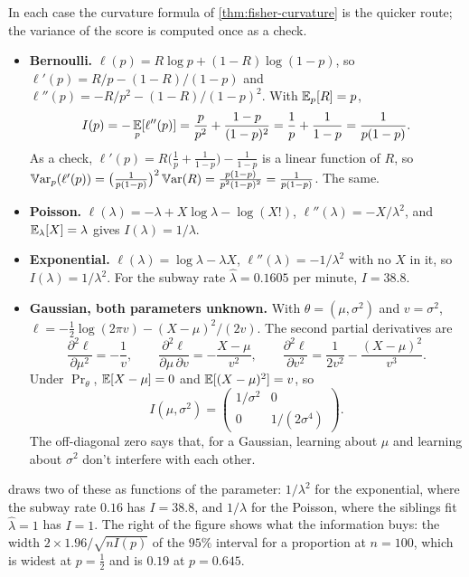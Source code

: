 \begin{worked}
In each case the curvature formula of \cref{thm:fisher-curvature} is the quicker route; the variance of the score is computed once as a check.
\begin{itemize}
\item \textbf{Bernoulli.} $\ell(p) = R\log p + (1 - R)\log(1 - p)$, so $\ell'(p) = R/p - (1-R)/(1-p)$ and $\ell''(p) = -R/p^2 - (1 - R)/(1-p)^2$. With $\operatorname*{\mathbb{E}}_p[R] = p$,
\[
I(p) = -\operatorname*{\mathbb{E}}_p[\ell''(p)] = \frac{p}{p^2} + \frac{1 - p}{(1-p)^2} = \frac1p + \frac{1}{1-p} = \frac{1}{p(1-p)}.
\]
As a check, $\ell'(p) = R\big(\frac1p + \frac{1}{1-p}\big) - \frac{1}{1-p}$ is a linear function of $R$, so $\operatorname*{\mathbb{V}\text{ar}}_p(\ell'(p)) = \big(\frac{1}{p(1-p)}\big)^2 \operatorname*{\mathbb{V}\text{ar}}(R) = \frac{p(1-p)}{p^2(1-p)^2} = \frac{1}{p(1-p)}$. The same.
\item \textbf{Poisson.} $\ell(\lambda) = -\lambda + X\log\lambda - \log(X!)$, $\ell''(\lambda) = -X/\lambda^2$, and $\operatorname*{\mathbb{E}}_\lambda[X] = \lambda$ gives $I(\lambda) = 1/\lambda$.
\item \textbf{Exponential.} $\ell(\lambda) = \log\lambda - \lambda X$, $\ell''(\lambda) = -1/\lambda^2$ with no $X$ in it, so $I(\lambda) = 1/\lambda^2$. For the subway rate $\hat{\lambda} = 0.1605$ per minute, $I = 38.8$.
\item \textbf{Gaussian, both parameters unknown.} With $\theta = (\mu, \sigma^2)$ and $v = \sigma^2$, $\ell = -\frac12\log(2\pi v) - (X - \mu)^2/(2v)$. The second partial derivatives are
\[
\frac{\partial^2\ell}{\partial\mu^2} = -\frac1v, \qquad \frac{\partial^2\ell}{\partial\mu\,\partial v} = -\frac{X - \mu}{v^2}, \qquad \frac{\partial^2\ell}{\partial v^2} = \frac{1}{2v^2} - \frac{(X - \mu)^2}{v^3}.
\]
Under $\Pr_\theta$, $\operatorname*{\mathbb{E}}[X - \mu] = 0$ and $\operatorname*{\mathbb{E}}[(X - \mu)^2] = v$, so
\[
I(\mu, \sigma^2) = \begin{pmatrix} 1/\sigma^2 & 0 \\ 0 & 1/(2\sigma^4) \end{pmatrix}.
\]
The off-diagonal zero says that, for a Gaussian, learning about $\mu$ and learning about $\sigma^2$ don't interfere with each other.
\end{itemize}
\end{worked}

 draws two of these as functions of the parameter: $1/\lambda^2$ for the exponential, where the subway rate $0.16$ has $I = 38.8$, and $1/\lambda$ for the Poisson, where the siblings fit $\hat{\lambda} = 1$ has $I = 1$.
The right of the figure shows what the information buys: the width $2 \times 1.96/\sqrt{nI(p)}$ of the $95\%$ interval for a proportion at $n = 100$, which is widest at $p = \frac12$ and is $0.19$ at $p = 0.645$.

